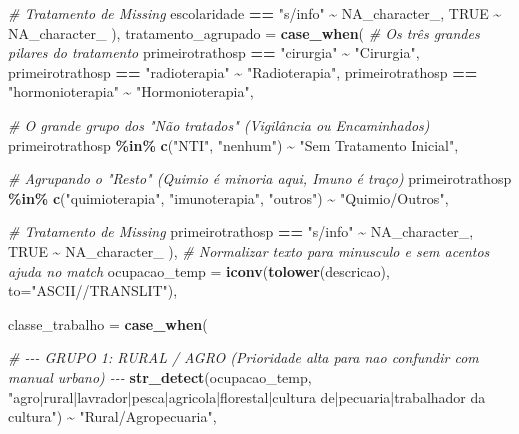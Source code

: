 \documentclass[
]{article}
\newenvironment{Shaded}{\begin{snugshade}}{\end{snugshade}}
\newcommand{\AttributeTok}[1]{\textcolor[rgb]{0.13,0.29,0.53}{#1}}
\newcommand{\CommentTok}[1]{\textcolor[rgb]{0.56,0.35,0.01}{\textit{#1}}}
\newcommand{\ConstantTok}[1]{\textcolor[rgb]{0.56,0.35,0.01}{#1}}
\newcommand{\FunctionTok}[1]{\textcolor[rgb]{0.13,0.29,0.53}{\textbf{#1}}}
\newcommand{\NormalTok}[1]{#1}
\newcommand{\SpecialCharTok}[1]{\textcolor[rgb]{0.81,0.36,0.00}{\textbf{#1}}}
\newcommand{\StringTok}[1]{\textcolor[rgb]{0.31,0.60,0.02}{#1}}
\begin{document}
\begin{Shaded}
\begin{Highlighting}[]
      \CommentTok{\# Tratamento de Missing}
\NormalTok{      escolaridade }\SpecialCharTok{==} \StringTok{"s/info"} \SpecialCharTok{\textasciitilde{}} \ConstantTok{NA\_character\_}\NormalTok{,}
      \ConstantTok{TRUE} \SpecialCharTok{\textasciitilde{}} \ConstantTok{NA\_character\_}
\NormalTok{    ),}
    \AttributeTok{tratamento\_agrupado =} \FunctionTok{case\_when}\NormalTok{(}
      \CommentTok{\# Os três grandes pilares do tratamento}
\NormalTok{      primeirotrathosp }\SpecialCharTok{==} \StringTok{"cirurgia"} \SpecialCharTok{\textasciitilde{}} \StringTok{"Cirurgia"}\NormalTok{,}
\NormalTok{      primeirotrathosp }\SpecialCharTok{==} \StringTok{"radioterapia"} \SpecialCharTok{\textasciitilde{}} \StringTok{"Radioterapia"}\NormalTok{,}
\NormalTok{      primeirotrathosp }\SpecialCharTok{==} \StringTok{"hormonioterapia"} \SpecialCharTok{\textasciitilde{}} \StringTok{"Hormonioterapia"}\NormalTok{,}
      
      \CommentTok{\# O grande grupo dos "Não tratados" (Vigilância ou Encaminhados)}
\NormalTok{      primeirotrathosp }\SpecialCharTok{\%in\%} \FunctionTok{c}\NormalTok{(}\StringTok{"NTI"}\NormalTok{, }\StringTok{"nenhum"}\NormalTok{) }\SpecialCharTok{\textasciitilde{}} \StringTok{"Sem Tratamento Inicial"}\NormalTok{,}
      
      \CommentTok{\# Agrupando o "Resto" (Quimio é minoria aqui, Imuno é traço)}
\NormalTok{      primeirotrathosp }\SpecialCharTok{\%in\%} \FunctionTok{c}\NormalTok{(}\StringTok{"quimioterapia"}\NormalTok{, }\StringTok{"imunoterapia"}\NormalTok{, }\StringTok{"outros"}\NormalTok{) }\SpecialCharTok{\textasciitilde{}} \StringTok{"Quimio/Outros"}\NormalTok{,}
      
      \CommentTok{\# Tratamento de Missing}
\NormalTok{      primeirotrathosp }\SpecialCharTok{==} \StringTok{"s/info"} \SpecialCharTok{\textasciitilde{}} \ConstantTok{NA\_character\_}\NormalTok{,}
      \ConstantTok{TRUE} \SpecialCharTok{\textasciitilde{}} \ConstantTok{NA\_character\_}
\NormalTok{    ),}
    \CommentTok{\# Normalizar texto para minusculo e sem acentos ajuda no \textquotesingle{}match\textquotesingle{}}
    \AttributeTok{ocupacao\_temp =} \FunctionTok{iconv}\NormalTok{(}\FunctionTok{tolower}\NormalTok{(descricao), }\AttributeTok{to=}\StringTok{"ASCII//TRANSLIT"}\NormalTok{),}
    
    \AttributeTok{classe\_trabalho =} \FunctionTok{case\_when}\NormalTok{(}
      
      \CommentTok{\# {-}{-}{-} GRUPO 1: RURAL / AGRO (Prioridade alta para nao confundir com manual urbano) {-}{-}{-}}
      \FunctionTok{str\_detect}\NormalTok{(ocupacao\_temp, }\StringTok{"agro|rural|lavrador|pesca|agricola|florestal|cultura de|pecuaria|trabalhador da cultura"}\NormalTok{) }\SpecialCharTok{\textasciitilde{}} \StringTok{"Rural/Agropecuaria"}\NormalTok{,}
      

\end{Highlighting}
\end{Shaded}
\end{document}
